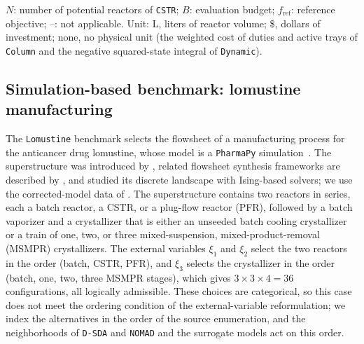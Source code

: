 \documentclass{article}
\begin{document}
\begin{table}[htbp]
\begin{threeparttable}
\begin{tabular}{@{}llcrrrrrcr@{}}
\bottomrule
\end{tabular}
\begin{tablenotes}[flushleft]\footnotesize
\item \(N\): number of potential reactors of \texttt{CSTR}; \(B\): evaluation budget; \(f_{\mathrm{ref}}\): reference objective; --: not applicable.
Unit: L, liters of reactor volume; \$, dollars of investment; none, no physical unit (the weighted cost of duties and active trays of \texttt{Column} and the negative squared-state integral of \texttt{Dynamic}).
\end{tablenotes}
\end{threeparttable}
\end{table}
\FloatBarrier

\subsection{Simulation-based benchmark: lomustine manufacturing}
\label{sec:lomustine-case}
The \texttt{Lomustine} benchmark selects the flowsheet of a manufacturing process for the anticancer drug lomustine, whose model is a \texttt{PharmaPy} simulation~\citep{casasorozco2021pharmapy,casasorozco2023techno}.
The superstructure was introduced by \citet{laky2022superstructure}, related flowsheet synthesis frameworks are described by \citet{barhate2025hybrid}, and \citet{park2026ising} studied its discrete landscape with Ising-based solvers; we use the corrected-model data of \citet{secquoiaPdIsing}.
The superstructure contains two reactors in series, each a batch reactor, a CSTR, or a plug-flow reactor (PFR), followed by a batch vaporizer and a crystallizer that is either an unseeded batch cooling crystallizer or a train of one, two, or three mixed-suspension, mixed-product-removal (MSMPR) crystallizers.
The external variables \(\xi_1\) and \(\xi_2\) select the two reactors in the order (batch, CSTR, PFR), and \(\xi_3\) selects the crystallizer in the order (batch, one, two, three MSMPR stages), which gives \(3\times3\times4=36\) configurations, all logically admissible.
These choices are categorical, so this case does not meet the ordering condition of the external-variable reformulation; we index the alternatives in the order of the source enumeration, and the neighborhoods of \texttt{D-SDA} and \texttt{NOMAD} and the surrogate models act on this order.
\end{document}
